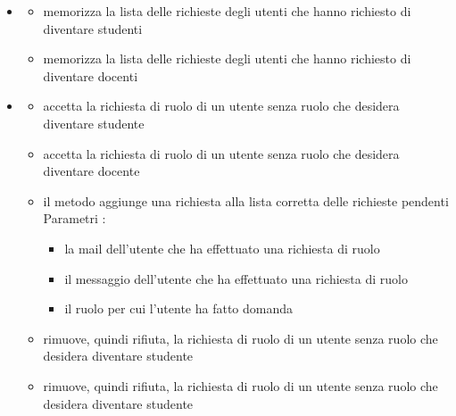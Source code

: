 \begin{itemize}
\item {}
\begin{itemize}
\item {}
\newline
memorizza la lista delle richieste degli utenti che hanno richiesto di diventare studenti
\item {}
\newline
memorizza la lista delle richieste degli utenti che hanno richiesto di diventare docenti
\end{itemize}
\item {}
\begin{itemize}
\item {}
\newline
accetta la richiesta di ruolo di un utente senza ruolo che desidera diventare studente
\newline
\item {}
\newline
accetta la richiesta di ruolo di un utente senza ruolo che desidera diventare docente
\newline
\item {}
\newline
il metodo aggiunge una richiesta alla lista corretta delle richieste pendenti
\newline
Parametri :
\begin{itemize}
\item {}
\newline
la mail dell'utente che ha effettuato una richiesta di ruolo
\item {}
\newline
il messaggio dell'utente che ha effettuato una richiesta di ruolo
\item {}
\newline
il ruolo per cui l'utente ha fatto domanda
\end{itemize}
\item {}
\newline
rimuove, quindi rifiuta, la richiesta di ruolo di un utente senza ruolo che desidera diventare studente
\newline
\item {}
\newline
rimuove, quindi rifiuta, la richiesta di ruolo di un utente senza ruolo che desidera diventare studente
\newline
\end{itemize}
\end{itemize}
